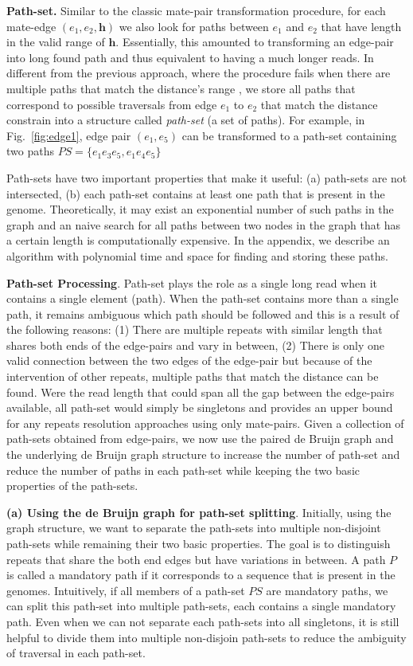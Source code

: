 \documentclass[12pt,a4paper,oneside]{article}
\begin{document}
\textbf{Path-set.}
Similar to the classic mate-pair transformation procedure, for each mate-edge $(e_1, e_2,\mathbf{h})$ we also look for paths between $e_1$
and $e_2$ that have length in the valid range of $\mathbf{h}$. Essentially, this amounted to transforming an edge-pair into long found path and
thus equivalent to having a much longer reads.  In different from the previous approach, where the procedure fails when there are multiple paths that match
the distance's range , we store all paths that correspond to possible traversals from edge $e_1$ to $e_2$ that match the distance constrain into a
structure called \emph{path-set} (a set of paths). For example, in Fig.~\ref{fig:edge1}, edge pair $(e_1, e_5)$ can be transformed to a path-set 
containing two paths $PS = \{e_1e_3e_5, e_1e_4e_5\}$


Path-sets have two important properties that make it useful: (a) path-sets are not intersected, (b) each path-set contains at least one 
path that is present in the genome. Theoretically, it may exist 
an exponential number of such paths in the graph and  an naive search for all paths between two nodes in the graph that
has a certain length is computationally expensive. In the appendix, we describe an algorithm with polynomial time and space for finding and
storing these paths. 


\textbf{Path-set Processing}.
Path-set plays the role as a single long read when it contains
a single element (path). When the path-set contains more than a single path, it remains ambiguous which path should be followed and this is a result of
the following reasons: (1) There are multiple repeats with similar length that shares both ends of the edge-pairs and vary in between, (2) There is only one 
valid connection between the two edges of the edge-pair but because of the intervention of other repeats, multiple paths 
that match the distance can be found. Were the read length that could span all the gap between the edge-pairs available, all path-set would 
simply be singletons and provides an upper bound for any repeats resolution approaches using only mate-pairs. Given a collection of path-sets obtained
from edge-pairs, we now use  the paired de Bruijn graph and the underlying de Bruijn graph structure to increase the number of path-set and
reduce the number of paths in each path-set while keeping the two basic properties of the path-sets.

\textbf{(a) Using the de Bruijn graph for path-set splitting}.
Initially, using the graph structure, we want to separate the path-sets into multiple non-disjoint path-sets while remaining their two basic 
properties. The goal is to distinguish repeats that share the both end edges but have variations in between. A path $P$ is called a mandatory
path if it  corresponds to a sequence that is present in the genomes. Intuitively, if all members of a path-set $PS$ are mandatory paths, we 
can split this path-set into multiple path-sets, each contains a single mandatory path. Even when we can not separate each path-sets into all
singletons, it is still helpful to divide them into multiple non-disjoin path-sets to reduce the ambiguity of traversal in each path-set.
\end{document}
